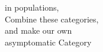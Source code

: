 \documentclass[preview]{standalone}
\begin{document}
\begin{center}
in populations,\\Combine these categories,\\and make our own\\asymptomatic Category
\end{center}
\end{document}
